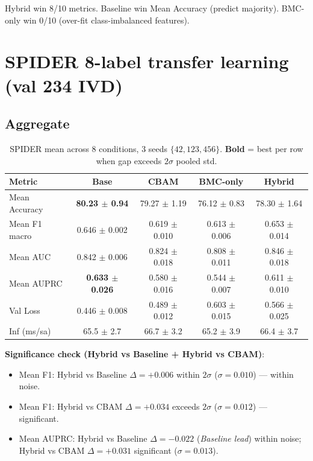 \documentclass[11pt,a4paper]{article}
\newcommand{\best}[1]{\textbf{#1}}
\begin{document}
\noindent Hybrid win 8/10 metrics. Baseline win Mean Accuracy (predict
majority). BMC-only win 0/10 (over-fit class-imbalanced features).

\section{SPIDER 8-label transfer learning (val 234 IVD)}

\subsection*{Aggregate}

\begin{table}[h]
\centering
\caption{SPIDER mean across 8 conditions, 3 seeds $\{42, 123, 456\}$.
\textbf{Bold} = best per row when gap exceeds $2\sigma$ pooled std.}
\begin{tabular}{@{}lcccc@{}}
\toprule
\rowcolor{tablehdr}
Metric & Base & CBAM & BMC-only & Hybrid \\
\midrule
Mean Accuracy & \best{80.23 $\pm$ 0.94} & 79.27 $\pm$ 1.19 & 76.12 $\pm$ 0.83 & 78.30 $\pm$ 1.64 \\
Mean F1 macro & 0.646 $\pm$ 0.002 & 0.619 $\pm$ 0.010 & 0.613 $\pm$ 0.006 & 0.653 $\pm$ 0.014 \\
Mean AUC      & 0.842 $\pm$ 0.006 & 0.824 $\pm$ 0.018 & 0.808 $\pm$ 0.011 & 0.846 $\pm$ 0.018 \\
Mean AUPRC    & \best{0.633 $\pm$ 0.026} & 0.580 $\pm$ 0.016 & 0.544 $\pm$ 0.007 & 0.611 $\pm$ 0.010 \\
\midrule
Val Loss      & 0.446 $\pm$ 0.008 & 0.489 $\pm$ 0.012 & 0.603 $\pm$ 0.015 & 0.566 $\pm$ 0.025 \\
Inf (ms/sa)   & 65.5 $\pm$ 2.7 & 66.7 $\pm$ 3.2 & 65.2 $\pm$ 3.9 & 66.4 $\pm$ 3.7 \\
\bottomrule
\end{tabular}
\end{table}

\noindent\textbf{Significance check (Hybrid vs Baseline + Hybrid vs
CBAM)}:
\begin{itemize}
\item Mean F1: Hybrid vs Baseline $\Delta = +0.006$ within $2\sigma$
($\sigma = 0.010$) --- within noise.
\item Mean F1: Hybrid vs CBAM $\Delta = +0.034$ exceeds $2\sigma$
($\sigma = 0.012$) --- significant.
\item Mean AUPRC: Hybrid vs Baseline $\Delta = -0.022$
(\emph{Baseline lead}) within noise; Hybrid vs CBAM $\Delta = +0.031$
significant ($\sigma = 0.013$).
\end{itemize}
\end{document}
